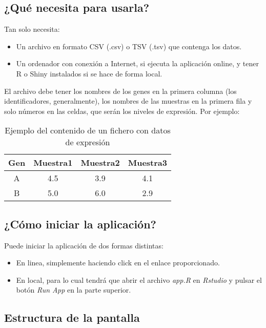 \subsection{¿Qué necesita para usarla?}

Tan solo necesita:

\begin{itemize}
    \item Un archivo en formato CSV (.csv) o TSV (.tsv) que contenga los datos.
    \item Un ordenador con conexión a Internet, si ejecuta la aplicación online, y tener R o Shiny instalados si se hace de forma local.
\end{itemize}

El archivo debe tener los nombres de los genes en la primera columna (los identificadores, generalmente), los nombres de las muestras en la primera
fila y solo números en las celdas, que serán los niveles de expresión. Por ejemplo:

\begin{table}[h!]
    \centering
    \begin{tabular}{|c|c|c|c|}
    \hline
    \textbf{Gen} & \textbf{Muestra1} & \textbf{Muestra2} & \textbf{Muestra3} \\
    \hline
    A & 4.5 & 3.9 & 4.1 \\
    B & 5.0 & 6.0 & 2.9 \\
    \hline
    \end{tabular}
    \caption{Ejemplo del contenido de un fichero con datos de expresión}
\end{table}
    

\subsection{¿Cómo iniciar la aplicación?}

Puede iniciar la aplicación de dos formas distintas:
\begin{itemize}
    \item En linea, simplemente haciendo click en el enlace proporcionado.
    \item En local, para lo cual tendrá que abrir el archivo \textit{app.R} en \textit{
        Rstudio} y pulsar el botón \textit{Run App} en la parte superior.
\end{itemize}

\subsection{Estructura de la pantalla}

